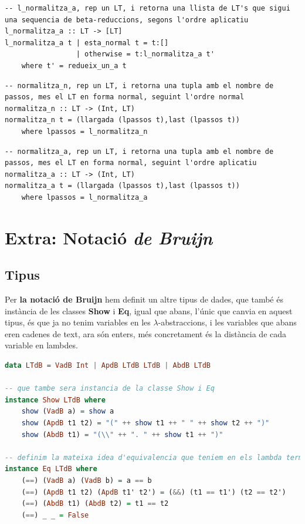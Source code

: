 \documentclass[10pt,a4paper]{article}
\begin{document}
\lstset{language=Haskell, breaklines=true, basicstyle=\footnotesize}
\begin{lstlisting}[frame=mystyle]
-- l_normalitza_a, rep un LT, i retorna una llista de LT's que sigui una sequencia de beta-reduccions, segons l'ordre aplicatiu
l_normalitza_a :: LT -> [LT]
l_normalitza_a t | esta_normal t = t:[]
                 | otherwise = t:l_normalitza_a t'
    where t' = redueix_un_a t
\end{lstlisting}



\lstset{language=Haskell, breaklines=true, basicstyle=\footnotesize}
\begin{lstlisting}[frame=mystyle]
-- normalitza_n, rep un LT, i retorna una tupla amb el nombre de passos, mes el LT en forma normal, seguint l'ordre normal
normalitza_n :: LT -> (Int, LT)
normalitza_n t = (llargada (lpassos t),last (lpassos t))
    where lpassos = l_normalitza_n
\end{lstlisting}

\lstset{language=Haskell, breaklines=true, basicstyle=\footnotesize}
\begin{lstlisting}[frame=mystyle]
-- normalitza_a, rep un LT, i retorna una tupla amb el nombre de passos, mes el LT en forma normal, seguint l'ordre aplicatiu
normalitza_a :: LT -> (Int, LT)
normalitza_a t = (llargada (lpassos t),last (lpassos t))
    where lpassos = l_normalitza_a
\end{lstlisting}

\clearpage

\section{Extra: Notació \textit{de Bruijn}}

\subsection{Tipus}

Per \textbf{la notació de Bruijn} hem definit un altre tipus de dades, que també és instància de les classes \textbf{Show} i \textbf{Eq}, igual que abans, l'únic que canvia en aquest tipus, és que ja no tenim variables en les $\lambda$-abstraccions, i les variables que abans eren cadenes de text, ara són enters, més concretament és la distància de cada variable en lambdes.

\begin{lstlisting}[language=Haskell]
data LTdB = VadB Int | ApdB LTdB LTdB | AbdB LTdB

-- que tambe sera instancia de la classe Show i Eq
instance Show LTdB where
    show (VadB a) = show a
    show (ApdB t1 t2) = "(" ++ show t1 ++ " " ++ show t2 ++ ")"
    show (AbdB t1) = "(\\" ++ ". " ++ show t1 ++ ")"

-- definim la mateixa idea d'equivalencia que teniem en els lambda termes pels lambda termes amb notacio de Bruijn
instance Eq LTdB where
    (==) (VadB a) (VadB b) = a == b
    (==) (ApdB t1 t2) (ApdB t1' t2') = (&&) (t1 == t1') (t2 == t2')
    (==) (AbdB t1) (AbdB t2) = t1 == t2
    (==) _ _ = False
\end{lstlisting}
\end{document}

